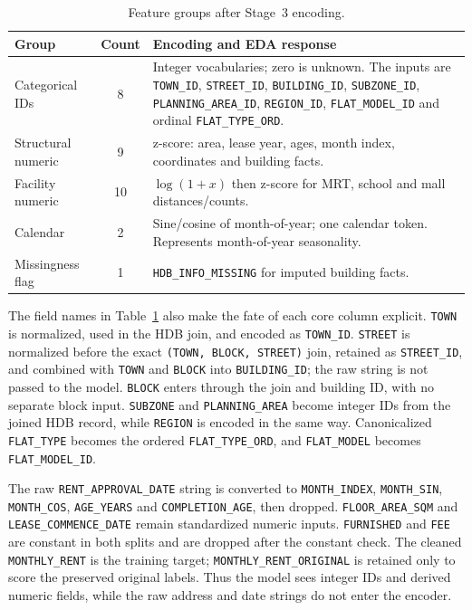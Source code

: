 \begin{table}[t]
\caption{Feature groups after Stage~3 encoding.}
\label{tab:features}
\centering
\footnotesize
\begin{tabularx}{\columnwidth}{@{}l c X@{}}
\toprule
Group & Count & Encoding and EDA response \\
\midrule
Categorical IDs & 8 & Integer vocabularies; zero is unknown. The inputs are \texttt{TOWN\_ID}, \texttt{STREET\_ID}, \texttt{BUILDING\_ID}, \texttt{SUBZONE\_ID}, \texttt{PLANNING\_AREA\_ID}, \texttt{REGION\_ID}, \texttt{FLAT\_MODEL\_ID} and ordinal \texttt{FLAT\_TYPE\_ORD}. \\
Structural numeric & 9 & z-score: area, lease year, ages, month index, coordinates and building facts. \\
Facility numeric & 10 & $\log(1+x)$ then z-score for MRT, school and mall distances/counts. \\
Calendar & 2 & Sine/cosine of month-of-year; one calendar token. Represents month-of-year seasonality. \\
Missingness flag & 1 & \texttt{HDB\_INFO\_MISSING} for imputed building facts. \\
\bottomrule
\end{tabularx}
\end{table}

The field names in Table~\ref{tab:features} also make the fate of each core column explicit.  \texttt{TOWN} is normalized, used in the HDB join, and encoded as \texttt{TOWN\_ID}.  \texttt{STREET} is normalized before the exact \texttt{(TOWN, BLOCK, STREET)} join, retained as \texttt{STREET\_ID}, and combined with \texttt{TOWN} and \texttt{BLOCK} into \texttt{BUILDING\_ID}; the raw string is not passed to the model.  \texttt{BLOCK} enters through the join and building ID, with no separate block input.  \texttt{SUBZONE} and \texttt{PLANNING\_AREA} become integer IDs from the joined HDB record, while \texttt{REGION} is encoded in the same way.  Canonicalized \texttt{FLAT\_TYPE} becomes the ordered \texttt{FLAT\_TYPE\_ORD}, and \texttt{FLAT\_MODEL} becomes \texttt{FLAT\_MODEL\_ID}.

The raw \texttt{RENT\_APPROVAL\_DATE} string is converted to \texttt{MONTH\_INDEX}, \texttt{MONTH\_SIN}, \texttt{MONTH\_COS}, \texttt{AGE\_YEARS} and \texttt{COMPLETION\_AGE}, then dropped.  \texttt{FLOOR\_AREA\_SQM} and \texttt{LEASE\_COMMENCE\_DATE} remain standardized numeric inputs.  \texttt{FURNISHED} and \texttt{FEE} are constant in both splits and are dropped after the constant check.  The cleaned \texttt{MONTHLY\_RENT} is the training target; \texttt{MONTHLY\_RENT\_ORIGINAL} is retained only to score the preserved original labels.  Thus the model sees integer IDs and derived numeric fields, while the raw address and date strings do not enter the encoder.

